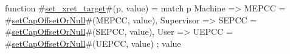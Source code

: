 function #\hyperref[sailRISCVzsetzyxretzytarget]{set\_xret\_target}#(p, value) = {
  match p {
    Machine    => MEPCC = #\hyperref[sailRISCVzsetCapOffsetOrNull]{setCapOffsetOrNull}#(MEPCC, value),
    Supervisor => SEPCC = #\hyperref[sailRISCVzsetCapOffsetOrNull]{setCapOffsetOrNull}#(SEPCC, value),
    User       => UEPCC = #\hyperref[sailRISCVzsetCapOffsetOrNull]{setCapOffsetOrNull}#(UEPCC, value)
  };
  value
}
